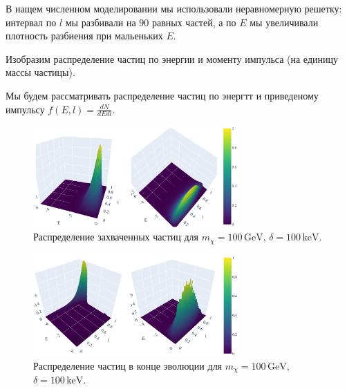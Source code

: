 %    
В нащем численном моделировании мы использовали неравномерную решетку: интервал по $l$ мы разбивали на $90$ равных частей, а по $E$ мы увеличивали плотность разбиения при мальеньких $E$.

Изобразим распределение частиц по энергии и моменту импульса (на единицу массы частицы). 

Мы будем рассматривать распределение частиц по энергтт и приведеному импульсу $f(E,l) = \frac{dN}{dE dl}$.

\begin{figure}[ht]
	\centering
	\includegraphics[width=0.7\textwidth]
	{images/Capt100_100.png}
	\caption{Распределение захваченных частиц для $m_{\chi} = 100\, \text{GeV}$, $\delta = 100\, \text{keV}$.}
	\label{fig:Capt100_100}
\end{figure}

\begin{figure}[!h]
	\centering
	\includegraphics[width=0.7\textwidth]
	{images/Dout100_100.png}
	\caption{Распределение частиц в конце эволюции для $m_{\chi} = 100\, \text{GeV}$, $\delta = 100\, \text{keV}$.}
	\label{fig:Dout100_100}
\end{figure}

